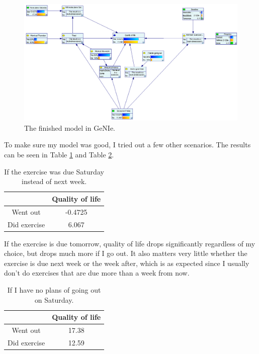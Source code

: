 \documentclass{article}
\begin{document}
    \begin{figure}[ht]
        \centering
        \includegraphics[width=\linewidth]{genie.png}
        \caption{The finished model in GeNIe.}
        \label{fig:genie}
    \end{figure}

    To make sure my model was good, I tried out a few other scenarios. The
    results can be seen in Table \ref{tab:tomorrow} and Table
    \ref{tab:saturday}.

    \begin{table}[ht]
        \centering
        \begin{tabular}{| c | c |}\hline
            & Quality of life\\\hline
            Went out & -0.4725\\\hline
            Did exercise & 6.067\\\hline
        \end{tabular}
        \caption{If the exercise was due Saturday instead of next week.}
        \label{tab:tomorrow}
    \end{table}

    If the exercise is due tomorrow, quality of life drops significantly
    regardless of my choice, but drops much more if I go out. It also matters
    very little whether the exercise is due next week or the week after, which
    is as expected since I usually don't do exercises that are due more than a
    week from now.

    \begin{table}[ht]
        \centering
        \begin{tabular}{| c | c |}\hline
            & Quality of life\\\hline
            Went out & 17.38\\\hline
            Did exercise & 12.59\\\hline
        \end{tabular}
        \caption{If I have no plans of going out on Saturday.}
        \label{tab:saturday}
    \end{table}
\end{document}
